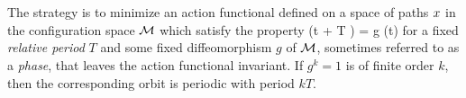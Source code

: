 %


\section{\descent}


The strategy
is to minimize an action functional defined on a space of paths $x$ in the
configuration space ${\cal M}$ which satisfy the property
\beq
                               \pSpace (t + T ) = g \cdot \pSpace (t)                       
\label{McC1}
\eeq
for a fixed {\em relative period} $T$ and some fixed diffeomorphism $g$ of ${\cal M}$, 
sometimes referred to as a {\em phase}, that leaves the 
action functional invariant. If $g^k=1$ is of finite order
$k$, then the corresponding orbit is periodic with period $k T$. 

